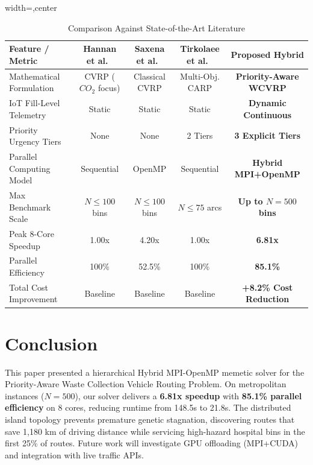 \documentclass[runningheads]{llncs}
\begin{document}
\begin{table}[t]
\centering
\caption{Comparison Against State-of-the-Art Literature}
\label{tab:comparison}
\setlength{\tabcolsep}{4pt}
\begin{adjustbox}{width=\textwidth,center}
\begin{tabular}{lcccc}
\toprule
\textbf{Feature / Metric} & \textbf{Hannan et al.~\cite{hannan2018capacitated}} & \textbf{Saxena et al.~\cite{saxena2020optimized}} & \textbf{Tirkolaee et al.~\cite{tirkolaee2023novel}} & \textbf{Proposed Hybrid} \\
\midrule
Mathematical Formulation & CVRP ($CO_2$ focus) & Classical CVRP & Multi-Obj. CARP & \textbf{Priority-Aware WCVRP} \\
IoT Fill-Level Telemetry & Static & Static & Static & \textbf{Dynamic Continuous} \\
Priority Urgency Tiers & None & None & 2 Tiers & \textbf{3 Explicit Tiers} \\
Parallel Computing Model & Sequential & OpenMP & Sequential & \textbf{Hybrid MPI+OpenMP} \\
Max Benchmark Scale & $N \le 100$ bins & $N \le 100$ bins & $N \le 75$ arcs & \textbf{Up to $N = 500$ bins} \\
Peak 8-Core Speedup & 1.00x & 4.20x & 1.00x & \textbf{6.81x} \\
Parallel Efficiency & 100\% & 52.5\% & 100\% & \textbf{85.1\%} \\
Total Cost Improvement & Baseline & Baseline & Baseline & \textbf{+8.2\% Cost Reduction} \\
\bottomrule
\end{tabular}
\end{adjustbox}
\end{table}

\section{Conclusion}
This paper presented a hierarchical Hybrid MPI-OpenMP memetic solver for the Priority-Aware Waste Collection Vehicle Routing Problem. On metropolitan instances ($N=500$), our solver delivers a \textbf{6.81x speedup} with \textbf{85.1\% parallel efficiency} on 8 cores, reducing runtime from 148.5s to 21.8s. The distributed island topology prevents premature genetic stagnation, discovering routes that save 1,180 km of driving distance while servicing high-hazard hospital bins in the first 25\% of routes. Future work will investigate GPU offloading (MPI+CUDA) and integration with live traffic APIs.



\end{document}
